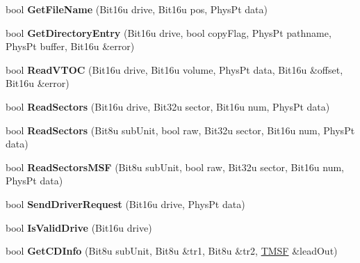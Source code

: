 \begin{DoxyCompactItemize}
\item 
\hypertarget{classCMscdex_aa02670c6961dddbe44b9330d6422712b}{bool {\bfseries Get\-File\-Name} (Bit16u drive, Bit16u pos, Phys\-Pt data)}\label{classCMscdex_aa02670c6961dddbe44b9330d6422712b}

\item 
\hypertarget{classCMscdex_a7af859df94d70eea08c953571a54ed36}{bool {\bfseries Get\-Directory\-Entry} (Bit16u drive, bool copy\-Flag, Phys\-Pt pathname, Phys\-Pt buffer, Bit16u \&error)}\label{classCMscdex_a7af859df94d70eea08c953571a54ed36}

\item 
\hypertarget{classCMscdex_ad0746c59d6eaee8c20d5267bec58a09b}{bool {\bfseries Read\-V\-T\-O\-C} (Bit16u drive, Bit16u volume, Phys\-Pt data, Bit16u \&offset, Bit16u \&error)}\label{classCMscdex_ad0746c59d6eaee8c20d5267bec58a09b}

\item 
\hypertarget{classCMscdex_ac97e8044bbe54cd19c9b1ffd2dcdb23b}{bool {\bfseries Read\-Sectors} (Bit16u drive, Bit32u sector, Bit16u num, Phys\-Pt data)}\label{classCMscdex_ac97e8044bbe54cd19c9b1ffd2dcdb23b}

\item 
\hypertarget{classCMscdex_a41e035bc2ef5add4d2d5e4b3cdb01178}{bool {\bfseries Read\-Sectors} (Bit8u sub\-Unit, bool raw, Bit32u sector, Bit16u num, Phys\-Pt data)}\label{classCMscdex_a41e035bc2ef5add4d2d5e4b3cdb01178}

\item 
\hypertarget{classCMscdex_a4968600c46a71d883d6709fe25ca903c}{bool {\bfseries Read\-Sectors\-M\-S\-F} (Bit8u sub\-Unit, bool raw, Bit32u sector, Bit16u num, Phys\-Pt data)}\label{classCMscdex_a4968600c46a71d883d6709fe25ca903c}

\item 
\hypertarget{classCMscdex_a2ab48935a7a8fd4292f3028243ab2b66}{bool {\bfseries Send\-Driver\-Request} (Bit16u drive, Phys\-Pt data)}\label{classCMscdex_a2ab48935a7a8fd4292f3028243ab2b66}

\item 
\hypertarget{classCMscdex_ab2481121272d8f87ed90f64fdc398af4}{bool {\bfseries Is\-Valid\-Drive} (Bit16u drive)}\label{classCMscdex_ab2481121272d8f87ed90f64fdc398af4}

\item 
\hypertarget{classCMscdex_ade59cf8040558852abb1dfbcec7189ad}{bool {\bfseries Get\-C\-D\-Info} (Bit8u sub\-Unit, Bit8u \&tr1, Bit8u \&tr2, \hyperlink{structSMSF}{T\-M\-S\-F} \&lead\-Out)}\label{classCMscdex_ade59cf8040558852abb1dfbcec7189ad}


\end{DoxyCompactItemize}
